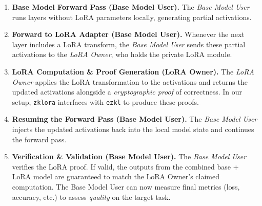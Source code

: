 \documentclass[11pt]{article}
\begin{document}
\begin{enumerate}
    \item \textbf{Base Model Forward Pass (Base Model User).}
    The \emph{Base Model User} runs layers without LoRA parameters locally, generating partial activations.

    \item \textbf{Forward to LoRA Adapter (Base Model User).}
    Whenever the next layer includes a LoRA transform, the \emph{Base Model User} sends these partial activations to the \emph{LoRA Owner}, who holds the private LoRA module.

    \item \textbf{LoRA Computation \& Proof Generation (LoRA Owner).}
    The \emph{LoRA Owner} applies the LoRA transformation to the activations and returns the updated activations alongside a \emph{cryptographic proof} of correctness. In our setup, \texttt{zklora} interfaces with \texttt{ezkl} to produce these proofs.

    \item \textbf{Resuming the Forward Pass (Base Model User).}
    The \emph{Base Model User} injects the updated activations back into the local model state and continues the forward pass. 

    \item \textbf{Verification \& Validation (Base Model User).}
    The \emph{Base Model User} verifies the LoRA proof. If valid, the outputs from the combined base + LoRA model are guaranteed to match the LoRA Owner’s claimed computation. The Base Model User can now measure final metrics (loss, accuracy, etc.) to assess \emph{quality} on the target task.
\end{enumerate}
\end{document}
